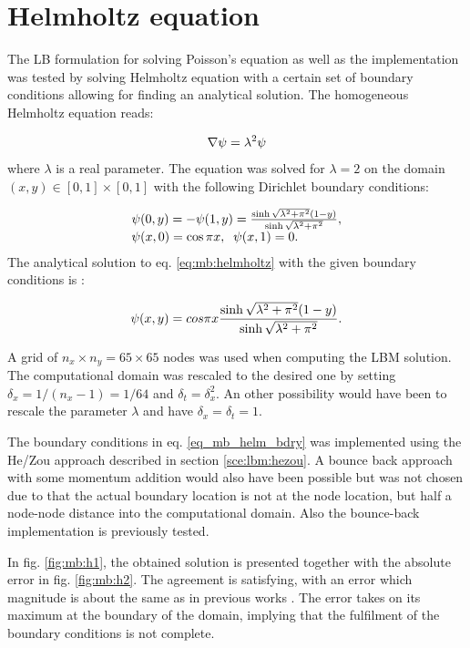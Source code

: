 \section{Helmholtz equation}
The LB formulation for solving Poisson's equation as well as the
implementation was tested by solving Helmholtz equation with a
certain set of boundary conditions allowing for finding an analytical
solution. The homogeneous Helmholtz equation reads:

\begin{equation}\label{eq:mb:helmholtz}
\nabla \mathrm{\psi} = \lambda^2 \mathrm{\psi}
\end{equation}
where $\lambda$ is a real parameter. The equation was solved for
$\lambda = 2$ on the domain $(x, y)\in[0, 1]\times[0, 1]$ with the
following Dirichlet boundary conditions:

\begin{equation}\label{eq:mb:helm_bdry}
  \begin{array}{l l}
\mathrm{\psi}(0, y) = -\mathrm{\psi}(1, y) = \frac{\sinh\sqrt{\lambda^2 + \pi^2}(1 -
  y)}{\sinh\sqrt{\lambda^2 + \pi^2}},\\ \mathrm{\psi}(x, 0) =
\cos\pi x,\;\; \mathrm{\psi}(x, 1) = 0.
\end{array}
\end{equation}
The analytical solution to eq. \eqref{eq:mb:helmholtz} with the given
boundary conditions is \cite{chai_poi}:

\begin{equation}
\mathrm{\psi}(x, y) = cos\pi x \frac{\sinh\sqrt{\lambda^2 + \pi^2}(1 -
  y)}{\sinh\sqrt{\lambda^2 + \pi^2}}.
\end{equation}

A grid of $n_x\times n_y = 65\times65$ nodes was used when computing the LBM
solution. The computational domain was rescaled to the desired one by
setting $\delta_x = 1/(n_x-1) = 1/64$ and $\delta_t = \delta_x^2$. An
other possibility would have been to rescale the parameter $\lambda$
and have $\delta_x = \delta_t = 1$.

The boundary conditions in eq. \eqref{eq_mb_helm_bdry} was implemented
using the He/Zou approach described in section \ref{sce:lbm:hezou}. A
bounce back approach with some momentum addition would also have been
possible but was not chosen due to that the actual boundary location
is not at the node location, but half a node-node distance into the
computational domain. Also the bounce-back implementation is
previously tested. 

In fig. \ref{fig:mb:h1}, the obtained solution is presented together
with the absolute error in fig. \ref{fig:mb:h2}. The agreement is
satisfying, with an error which magnitude is about the same as in
previous works \cite{chai_poi}. The error takes on its maximum at the
boundary of the domain, implying that the fulfilment of the boundary
conditions is not complete.

